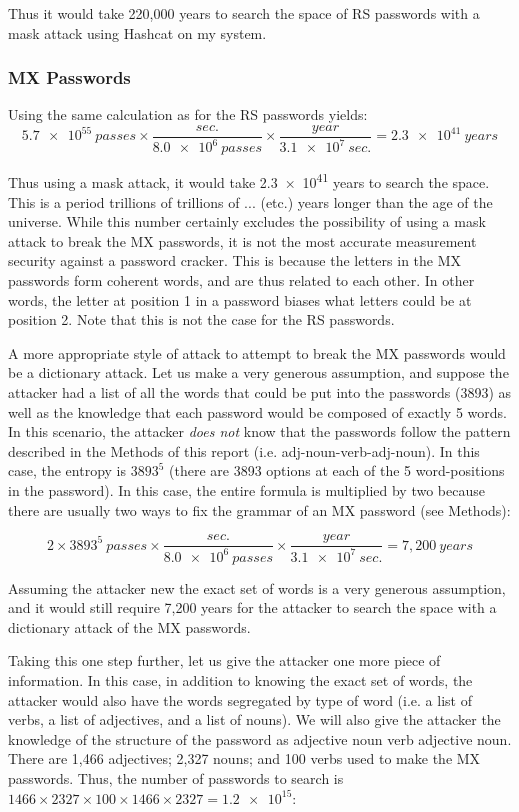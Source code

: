 \documentclass{article}
\begin{document}
Thus it would take 220,000 years to search the space of RS passwords with a mask attack using Hashcat on my system.

\subsubsection*{MX Passwords}
Using the same calculation as for the RS passwords yields:
$$\num{5.7e55}~passes \times \frac{sec.}{\num{8.0e6}~passes} \times \frac{year}{\num{3.1e7}~sec.} = \num{2.3e41}~years$$

Thus using a mask attack, it would take \num{2.3e41} years to search the space. This is a period trillions of trillions of ... (etc.) years longer than the age of the universe. While this number certainly excludes the possibility of using a mask attack to break the MX passwords, it is not the most accurate measurement security against a password cracker. This is because the letters in the MX passwords form coherent words, and are thus related to each other. In other words, the letter at position 1 in a password biases what letters could be at position 2. Note that this is not the case for the RS passwords. 

A more appropriate style of attack to attempt to break the MX passwords would be a dictionary attack. Let us make a very generous assumption, and suppose the attacker had a list of all the words that could be put into the passwords (3893) as well as the knowledge that each password would be composed of exactly 5 words. In this scenario, the attacker \emph{does not} know that the passwords follow the pattern described in the Methods of this report (i.e. adj-noun-verb-adj-noun). In this case, the entropy is $3893^5$ (there are 3893 options at each of the 5 word-positions in the password). In this case, the entire formula is multiplied by two because there are usually two ways to fix the grammar of an MX password (see Methods):

$$2 \times 3893^5~passes \times \frac{sec.}{\num{8.0e6}~passes} \times \frac{year}{\num{3.1e7}~sec.} = 7,200~years$$

Assuming the attacker new the exact set of words is a very generous assumption, and it would still require 7,200 years for the attacker to search the space with a dictionary attack of the MX passwords. 

Taking this one step further, let us give the attacker one more piece of information. In this case, in addition to knowing the exact set of words, the attacker would also have the words segregated by type of word (i.e. a list of verbs, a list of adjectives, and a list of nouns). We will also give the attacker the knowledge of the structure of the password as adjective noun verb adjective noun. There are 1,466 adjectives; 2,327 nouns; and 100 verbs used to make the MX passwords. Thus, the number of passwords to search is $1466 \times 2327 \times 100 \times 1466 \times 2327 = \num{1.2e15}$:
\end{document}
